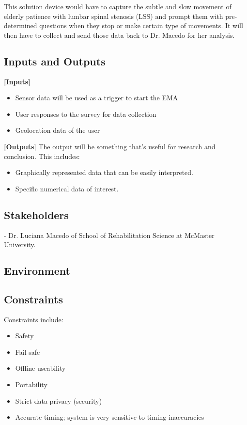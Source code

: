 \documentclass{article}
\begin{document}
This solution device would have to capture the subtle and slow movement of elderly patience with lumbar spinal stenosis (LSS) and prompt them with pre-determined questions when they stop or make certain type of  movements. It will then have to collect and send those data back to Dr. Macedo for her analysis.

\subsection{Inputs and Outputs}

\textbf{[Inputs]}
\begin{itemize}
    \item Sensor data will be used as a trigger to start the EMA
    \item User responses to the survey for data collection
    \item Geolocation data of the user
\end{itemize}
\pagebreak
\textbf{[Outputs]}
\linebreak
The output will be something that's useful for research and conclusion. This includes:
\begin{itemize}
    \item Graphically represented data that can be easily interpreted.
    \item Specific numerical data of interest.
\end{itemize}

\subsection{Stakeholders}

- Dr. Luciana Macedo of School of Rehabilitation Science at McMaster University.

\subsection{Environment}

\subsection{Constraints}
Constraints include:
\begin{itemize}
    \item Safety
    \item Fail-safe
    \item Offline useability
    \item Portability
    \item Strict data privacy (security)
    \item Accurate timing; system is very sensitive to timing inaccuracies
\end{itemize}
\end{document}
